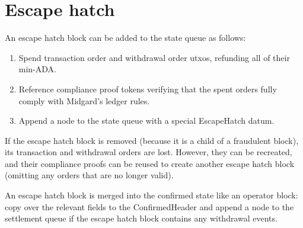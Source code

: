 \documentclass[../midgard.tex]{subfiles}
\begin{document}
\section{Escape hatch}
\label{h:escape-hatch}
\todo

An escape hatch block can be added to the state queue as follows:
\begin{enumerate}
    \item Spend transaction order and withdrawal order utxos, refunding all of their min-ADA.
    \item Reference compliance proof tokens verifying that the spent orders fully comply with Midgard's ledger rules.
    \item Append a node to the state queue with a special EscapeHatch datum.
\end{enumerate}

If the escape hatch block is removed (because it is a child of a fraudulent block), its transaction and withdrawal orders are lost.
However, they can be recreated, and their compliance proofs can be reused to create another escape hatch block (omitting any orders that are no longer valid).

An escape hatch block is merged into the confirmed state like an operator block: copy over the relevant fields to the ConfirmedHeader and append a node to the settlement queue if the escape hatch block contains any withdrawal events.
\end{document}

